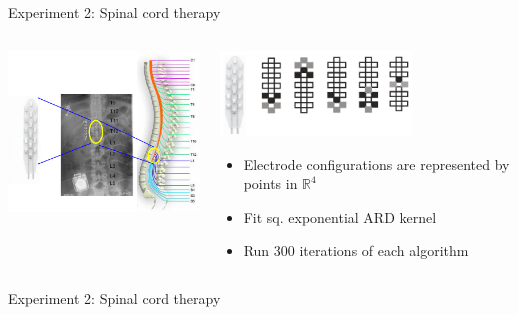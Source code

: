 \documentclass[xetex,10pt,mathserif,handout]{beamer}
\newlength\figureheight
\newlength\figurewidth
\begin{document}
\begin{frame}{Experiment 2: Spinal cord therapy}
\begin{columns}[c]
\begin{center}
\includegraphics[width=2.5in]{figures/config1.png}
\end{center}
\begin{center}
\includegraphics[width=2in]{figures/config2.png}
\vspace{2em}
\begin{itemize}
\item Electrode configurations are represented by points in $\mathbb{R}^4$
\vspace{1em}
\item Fit sq. exponential ARD kernel
\vspace{1em}
\item Run 300 iterations of each algorithm
\end{itemize}
\end{center}
\end{columns}
\end{frame}

\begin{frame}{Experiment 2: Spinal cord therapy}
\begin{columns}[c]
\begin{center}
\setlength\figurewidth{2.5in}
\setlength\figureheight{1.7in}
\end{center}
\centering
\setlength\figurewidth{2.5in}
\setlength\figureheight{3.7in}
\end{columns}
\end{frame}
\end{document}
